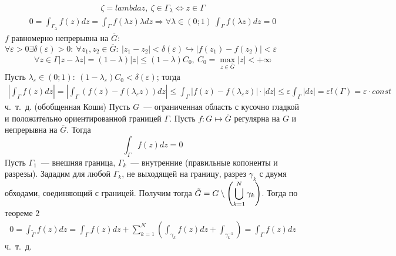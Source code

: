 \begin{align*}
  \zeta = lambda z, \ \zeta \in \Gamma_{\lambda} \Leftrightarrow z \in \Gamma
\end{align*}
\begin{align*}
  0 = \int_{\Gamma_\lambda}f(z)dz = \int_{\Gamma}f(\lambda z)\lambda dz \Rightarrow \forall \lambda \in (0;1) \ \int_{\Gamma}f(\lambda z)dz = 0
\end{align*}
$f$ равномерно непрерывна на $\overline{G}$: $\forall \varepsilon > 0 \exists
\delta(\varepsilon) >0: \ \forall z_1, z_2 \in \overline{G}: \ \left| z_1-z_2
\right| < \delta(\varepsilon) \hookrightarrow \left| f(z_1) - f(z_2) \right| < \varepsilon$
\begin{align*}
  \forall z \in \Gamma \left| z-\lambda z \right| = (1-\lambda) \left| z \right| \leq (1-\lambda)C_0, \ C_0 = \max_{z \in \overline{G}}\left| z \right| < +\infty
\end{align*}
Пусть $\lambda_{\varepsilon}\in(0;1): \ (1 -
\lambda_{\varepsilon})C_0<\delta(\varepsilon)$; тогда
\begin{align*}
  \left| \int_{\Gamma}f(z)dz \right|= \left| \int_{\Gamma}\left( f(z)-f(\lambda_{\varepsilon}z) \right)dz \right|\leq \int_{\Gamma} \left| f(z) - f(\lambda_{\varepsilon}z) \right| \cdot \left| dz \right| \leq \varepsilon \int_{\Gamma} \left| dz \right| = \varepsilon l(\Gamma) = \varepsilon \cdot const
\end{align*}
ч.~т.~д.
\theorem (обобщенная Коши) Пусть $G$~--- ограниченная область с кусочно гладкой
и положительно ориентированной границей $\Gamma$. Пусть $f: G \mapsto
\overline{G}$ регулярна на $G$ и непрерывна на $\overline{G}$. Тогда
\begin{equation} \label{(7.5)}
  \int_{\Gamma}f(z)dz = 0
\end{equation}
\pr
Пусть $\Gamma_1$~--- внешняя граница, $\Gamma_k$~--- внутренние (правильные
копоненты и разрезы). Зададим для любой $\Gamma_k$, не выходящей на границу,
разрез $\gamma_k$ с двумя обходами, соединяющий с границей. Получим тогда
$\tilde{G} = G \setminus \left(\displaystyle \bigcup_{k=1}^N \gamma_k \right)$. Тогда по
теореме $2$
\begin{align*}
  0 = \int_{\tilde{\Gamma}}f(z)dz = \int_{\Gamma} f(z)dz + \sum_{k=1}^N\left( \int_{\gamma_k} f(z) dz + \int_{\gamma_k^{-1}} \right) = \int_{\Gamma} f(z) dz
\end{align*}
ч.~т.~д.
\\